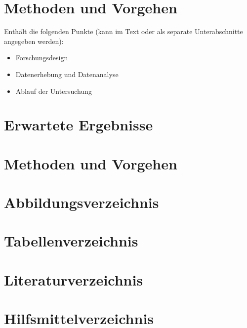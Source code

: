 \documentclass{ffhsthesis}
\begin{document}
\chapter{Methoden und Vorgehen}
Enthält die folgenden Punkte (kann im Text oder als separate Unterabschnitte angegeben werden):
\begin{itemize}
    \item Forschungsdesign
    \item Datenerhebung und Datenanalyse
    \item Ablauf der Untersuchung
\end{itemize}

\chapter{Erwartete Ergebnisse}

\chapter{Methoden und Vorgehen}




\newpage
\chapter*{Abbildungsverzeichnis}

\newpage
\chapter*{Tabellenverzeichnis}

\newpage
\chapter*{Literaturverzeichnis}

\newpage
\chapter*{Hilfsmittelverzeichnis}
\end{document}
